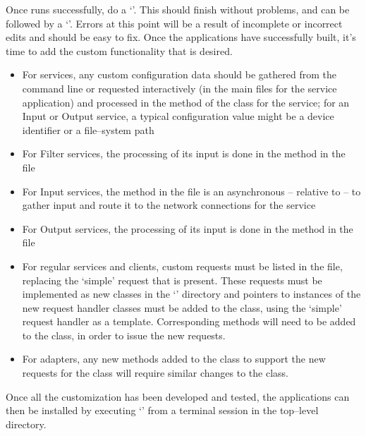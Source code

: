 Once  runs successfully, do a `'.
This should finish without problems, and can be followed by a `'.
Errors at this point will be a result of incomplete or incorrect edits and should be easy
to fix.
\tertiaryEnd{}
Once the applications have successfully built, it's time to add the custom functionality
that is desired.
\begin{itemize}
\item For  services, any custom configuration data should be gathered from
the command line or requested interactively (in the main files for the service
application) and processed in the  method of the class for the service;
for an Input or Output service, a typical configuration value might be a device
identifier or a file--system path
\item For Filter services, the processing of its input is done in the 
method in the\\
 file
\item For Input services, the  method in the 
file is an asynchronous -- relative to \mplusm{} -- to gather input and route it to the
\yarp{} network connections for the service
\item For Output services, the processing of its input is done in the 
method in the\\
 file
\item For regular services and clients, custom requests must be listed in the
 file, replacing the `simple' request that is present.
These requests must be implemented as new classes in the `' directory
and pointers to instances of the new request handler classes must be added to the
 class, using the `simple' request handler as a template.
Corresponding methods will need to be added to the  class, in order to
issue the new requests.
\item For adapters, any new methods added to the  class to support the
new requests for the  class will require similar changes to the
 class.
\end{itemize}
\tertiaryEnd{}
Once all the customization has been developed and tested, the applications can then be
installed by executing `' from a terminal session in the
top--level directory.
\tertiaryEnd{}
\secondaryEnd{}
\appendixEnd{}
